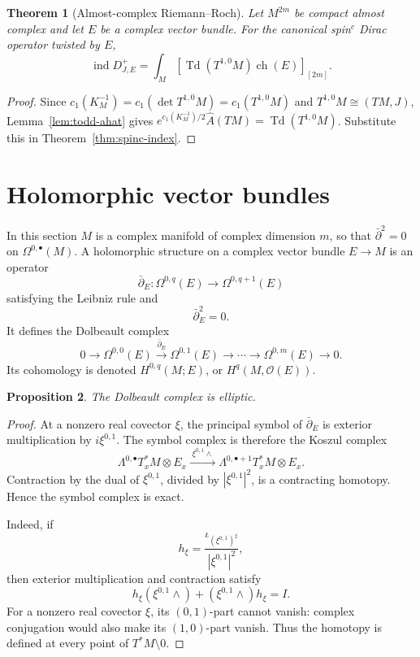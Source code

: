 \documentclass[11pt,oneside,reqno]{book}
\newcommand{\Ahat}{\widehat A}
\theoremstyle{plain}
\newtheorem{theorem}{Theorem}[chapter]
\newtheorem{proposition}[theorem]{Proposition}
\theoremstyle{definition}
\theoremstyle{remark}
\begin{document}
\begin{theorem}[Almost-complex Riemann--Roch]\label{thm:almost-rr}
Let \(M^{2m}\) be compact almost complex and let \(E\) be a complex vector
bundle. For the canonical spin\(^{c}\) Dirac operator twisted by \(E\),
\[
 \operatorname{ind}D_{J,E}^+
 =
 \int_M
 \left[
 \operatorname{Td}(T^{1,0}M)\operatorname{ch}(E)
 \right]_{[2m]}.
\]
\end{theorem}

\begin{proof}
Since \(c_1(K_M^{-1})=c_1(\det T^{1,0}M)=c_1(T^{1,0}M)\) and
\(T^{1,0}M\cong(TM,J)\), Lemma~\ref{lem:todd-ahat} gives
\(e^{c_1(K_M^{-1})/2}\Ahat(TM)=\operatorname{Td}(T^{1,0}M)\).  Substitute
this in Theorem~\ref{thm:spinc-index}.
\end{proof}

\section{Holomorphic vector bundles}

In this section \(M\) is a complex manifold of complex dimension \(m\),
so that \(\bar\partial^2=0\) on \(\Omega^{0,\bullet}(M)\).  A holomorphic
structure on a complex vector bundle \(E\to M\) is an operator
\[
 \bar\partial_E:\Omega^{0,q}(E)\longrightarrow\Omega^{0,q+1}(E)
\]
satisfying the Leibniz rule and
\[
 \bar\partial_E^2=0.
\]
It defines the Dolbeault complex
\[
 0\longrightarrow\Omega^{0,0}(E)
 \xrightarrow{\bar\partial_E}\Omega^{0,1}(E)
 \longrightarrow\cdots
 \longrightarrow\Omega^{0,m}(E)
 \longrightarrow0.
\]
Its cohomology is denoted \(H^{0,q}(M;E)\), or \(H^q(M,\mathcal O(E))\).

\begin{proposition}
The Dolbeault complex is elliptic.
\end{proposition}

\begin{proof}
At a nonzero real covector \(\xi\), the principal symbol of
\(\bar\partial_E\) is exterior multiplication by \(i\xi^{0,1}\). The symbol
complex is therefore the Koszul complex
\[
 \Lambda^{0,\bullet}T_x^*M\otimes E_x
 \xrightarrow{\;\xi^{0,1}\wedge\;}
 \Lambda^{0,\bullet+1}T_x^*M\otimes E_x.
\]
Contraction by the dual of \(\xi^{0,1}\), divided by
\(|\xi^{0,1}|^2\), is a contracting homotopy. Hence the symbol complex is
exact.

Indeed, if
\[
 h_\xi=\frac{\iota_{(\xi^{0,1})^\sharp}}{|\xi^{0,1}|^2},
\]
then exterior multiplication and contraction satisfy
\[
 h_\xi(\xi^{0,1}\wedge)
 +(\xi^{0,1}\wedge)h_\xi=I.
\]
For a nonzero real covector \(\xi\), its \((0,1)\)-part cannot vanish:
complex conjugation would also make its \((1,0)\)-part vanish. Thus the
homotopy is defined at every point of \(T^*M\setminus0\).
\end{proof}
\end{document}
